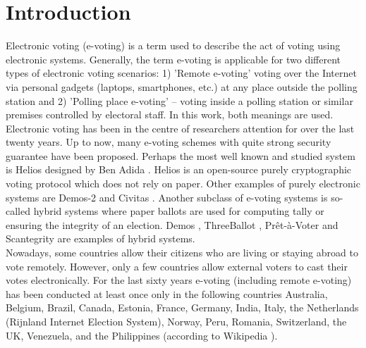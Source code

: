 \chapter{Introduction}

Electronic voting (e-voting) is a term used to describe the act of voting using electronic systems. Generally, the term e-voting is applicable for two different types of electronic voting scenarios:  1) 'Remote e-voting' voting over the Internet via personal gadgets (laptops, smartphones, etc.) at any place outside the polling station and  2) 'Polling place e-voting' -- voting inside a polling station or similar premises controlled by electoral staff. In this work, both meanings are used.\\

Electronic voting has been in the centre of researchers attention for over the last twenty years. Up to now, many e-voting schemes with quite strong security guarantee have been proposed. Perhaps the most well known and studied system is Helios designed by Ben Adida \cite{Adida2008}.  Helios is an open-source purely cryptographic voting protocol which does not rely on paper. Other examples of purely electronic systems are Demos-2 \cite{Kiayias2015} and Civitas \cite{Clarkson2008}.  Another subclass of e-voting systems is so-called hybrid systems where paper ballots are used for computing tally or ensuring the integrity of an election. Demos \cite{Kiayias2015a}, ThreeBallot \cite{Rivest2006}, Pr\^{e}t-\`a-Voter \cite{Ryan2006} and Scantegrity \cite{Chaum2009} are examples of hybrid systems.  \\

Nowadays, some countries allow their citizens who are living or staying abroad to vote remotely. However, only a few countries allow external voters to cast their votes electronically. For the last sixty years e-voting (including remote e-voting) has been conducted at least once only in the following countries Australia, Belgium, Brazil, Canada, Estonia, France, Germany, India, Italy, the Netherlands (Rijnland Internet Election System), Norway, Peru, Romania, Switzerland, the UK, Venezuela, and the Philippines (according to Wikipedia \cite{wiki}).\\


